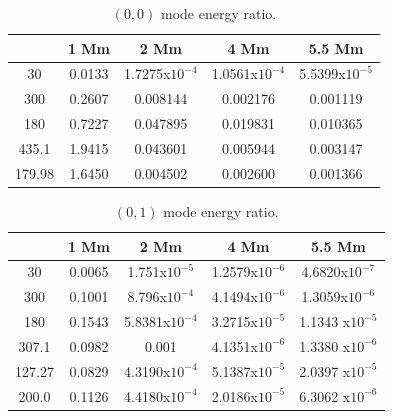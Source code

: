 \documentclass[preprint,authoryear,12pt]{elsarticle}
\begin{document}
\begin{table}[h]
\centering
\begin{tabular}{c c c c c }
\hline
   &  1 Mm & 2 Mm & 4 Mm & 5.5 Mm \\
\hline
30 &  0.0133 & 1.7275x$10^{-4}$ & 1.0561x$10^{-4}$ & 5.5399x$10^{-5}$ \\
\hline
300 & 0.2607 & 0.008144 & 0.002176 &  0.001119 \\
\hline
180 & 0.7227 & 0.047895 & 0.019831 &  0.010365 \\
\hline
435.1 & 1.9415 & 0.043601 & 0.005944 & 0.003147  \\
\hline
179.98 & 1.6450 & 0.004502 & 0.002600&  0.001366 \\ 
\hline
\hline
\end{tabular} 
\caption{ $(0, 0)$ mode energy ratio.}
\label{Table00mode}
\end{table}

\begin{table}[h]
\centering
\begin{tabular}{c c c c c }
\hline
   &  1 Mm & 2 Mm & 4 Mm & 5.5 Mm \\
\hline
30 &  0.0065 & 1.751x$10^{-5}$ &  1.2579x$10^{-6}$ & 4.6820x$10^{-7}$ \\
\hline
300 & 0.1001 & 8.796x$10^{-4}$ &  4.1494x$10^{-6}$ &  1.3059x$10^{-6}$ \\
\hline
180 & 0.1543 &  5.8381x$10^{-4}$ &  3.2715x$10^{-5}$ &  1.1343 x$10^{-5}$ \\
\hline
307.1 & 0.0982 & 0.001 & 4.1351x$10^{-6}$ & 1.3380 x$10^{-6}$  \\
\hline
127.27 & 0.0829 &  4.3190x$10^{-4}$ &  5.1387x$10^{-5}$ & 2.0397 x$10^{-5}$ \\ 
\hline
200.0 & 0.1126 &  4.4180x$10^{-4}$ &  2.0186x$10^{-5}$ & 6.3062 x$10^{-6}$ \\
\hline
\end{tabular} 
\caption{ $(0, 1)$ mode energy ratio.}
\label{Table01mode}
\end{table}
\end{document}
